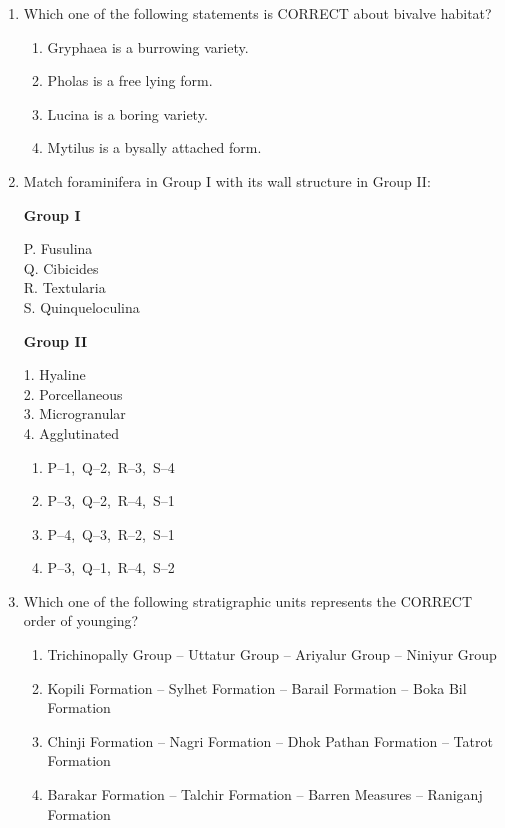 \documentclass[journal,12pt,onecolumn]{IEEEtran}
\theoremstyle{remark}
\begin{document}
\begin{enumerate}
\item Which one of the following statements is CORRECT about bivalve habitat?  
\begin{enumerate}
\item Gryphaea is a burrowing variety.
\item Pholas is a free lying form.
\item Lucina is a boring variety.
\item Mytilus is a bysally attached form.
\end{enumerate}




\item Match foraminifera in Group I with its wall structure in Group II:

\begin{multicols}{2}
\textbf{Group I}
\begin{flushleft}
P. Fusulina\\
Q. Cibicides\\
R. Textularia\\
S. Quinqueloculina
\end{flushleft}

\columnbreak

\textbf{Group II}
\begin{flushleft}
1. Hyaline\\
2. Porcellaneous\\
3. Microgranular\\
4. Agglutinated
\end{flushleft}
\end{multicols}

\begin{multicols}{2}
\begin{enumerate}
\item P--1,\ Q--2,\ R--3,\ S--4
\item P--3,\ Q--2,\ R--4,\ S--1
\item P--4,\ Q--3,\ R--2,\ S--1
\item P--3,\ Q--1,\ R--4,\ S--2
\end{enumerate}
\end{multicols}



\item Which one of the following stratigraphic units represents the CORRECT order of younging?  
\begin{enumerate}
\item Trichinopally Group -- Uttatur Group -- Ariyalur Group -- Niniyur Group
\item Kopili Formation -- Sylhet Formation -- Barail Formation -- Boka Bil Formation
\item Chinji Formation -- Nagri Formation -- Dhok Pathan Formation -- Tatrot Formation
\item Barakar Formation -- Talchir Formation -- Barren Measures -- Raniganj Formation
\end{enumerate}





\end{enumerate}
\end{document}
